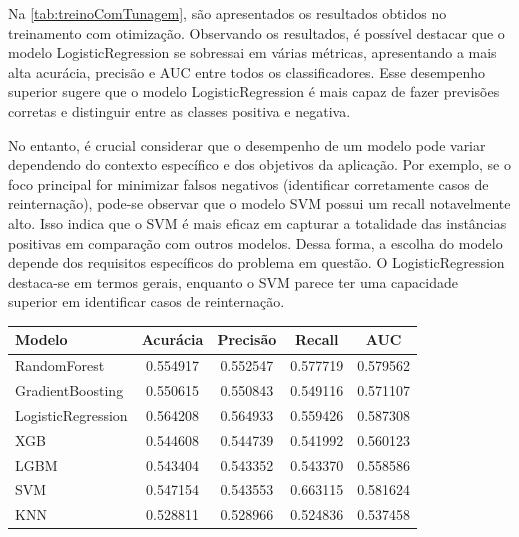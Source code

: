 Na \autoref{tab:treinoComTunagem}, são apresentados os resultados obtidos no treinamento com otimização. Observando os resultados, é possível destacar que o modelo LogisticRegression se sobressai em várias métricas, apresentando a mais alta acurácia, precisão e AUC entre todos os classificadores. Esse desempenho superior sugere que o modelo LogisticRegression é mais capaz de fazer previsões corretas e distinguir entre as classes positiva e negativa.

No entanto, é crucial considerar que o desempenho de um modelo pode variar dependendo do contexto específico e dos objetivos da aplicação. Por exemplo, se o foco principal for minimizar falsos negativos (identificar corretamente casos de reinternação), pode-se observar que o modelo SVM possui um recall notavelmente alto. Isso indica que o SVM é mais eficaz em capturar a totalidade das instâncias positivas em comparação com outros modelos. Dessa forma, a escolha do  modelo depende dos requisitos específicos do problema em questão. O LogisticRegression destaca-se em termos gerais, enquanto o SVM parece ter uma capacidade superior em identificar casos de reinternação.

\begin{table}
	{
		\begin{tabular}{lcccc}
			\toprule
			\textbf{Modelo} & \textbf{Acurácia} & \textbf{Precisão} & \textbf{Recall} & \textbf{AUC} \\
			\midrule \midrule
			RandomForest & 0.554917 & 0.552547 & 0.577719 & 0.579562 \\
			\midrule
			GradientBoosting & 0.550615 & 0.550843 & 0.549116 & 0.571107 \\
			\midrule
			LogisticRegression & 0.564208 & 0.564933 & 0.559426 & 0.587308 \\
			\midrule
			XGB & 0.544608 & 0.544739 & 0.541992 & 0.560123 \\
			\midrule
			LGBM & 0.543404 & 0.543352 & 0.543370 & 0.558586 \\
			\midrule
			SVM & 0.547154 & 0.543553 & 0.663115 & 0.581624 \\
			\midrule
			KNN & 0.528811 & 0.528966 & 0.524836 & 0.537458 \\
			\bottomrule
		\end{tabular}
	}
	{
	}
\end{table}

